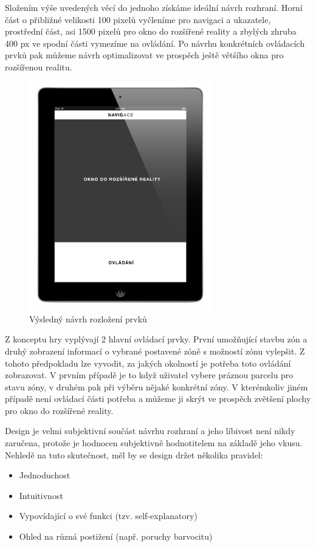 \documentclass[twoside,12pt]{article}
\begin{document}
Složením výše uvedených věcí do jednoho získáme ideální návrh rozhraní. Horní část o přibližné velikosti 100 pixelů vyčleníme pro navigaci a ukazatele, prostřední část, asi 1500 pixelů pro okno do rozšířené reality a zbylých zhruba 400 px ve spodní části vymezíme na ovládání. Po návrhu konkrétních ovládacích prvků pak můžeme návrh optimalizovat ve prospěch ještě většího okna pro rozšířenou realitu.

\begin{figure}[H]
\centering
    \includegraphics[width=300px, center]{images/ipad_layout_ux.jpg}
\captionsetup{justification=centering}
    \caption{Výsledný návrh rozložení prvků}
    \label{class_diagram}
\end{figure}

Z konceptu hry vyplývají 2 hlavní ovládací prvky. První umožňující stavbu zón a druhý zobrazení informací o vybrané postavené zóně s možností zónu vylepšit. Z tohoto předpokladu lze vyvodit, za jakých okolností je potřeba toto ovládání zobrazovat. V prvním případě je to když uživatel vybere práznou parcelu pro stavu zóny, v druhém pak při výběru nějaké konkrétní zóny. V kterémkoliv jiném případě není ovládací části potřeba a můžeme ji skrýt ve prospěch zvětšení plochy pro okno do rozšířené reality.


Design je velmi subjektivní součást návrhu rozhraní a jeho líbivost není nikdy zaručena, protože je hodnocen subjektivně hodnotitelem na základě jeho vkusu. Nehledě na tuto skutečnost, měl by se design držet několika pravidel:

\begin{itemize}
\item Jednoduchost
\item Intuitivnost
\item Vypovídající o své funkci (tzv. self-explanatory)
\item Ohled na různá postižení (např. poruchy barvocitu) 
\end{itemize}
\end{document}
